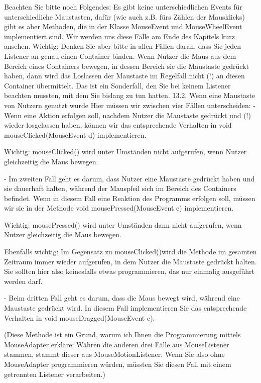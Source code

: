 Beachten Sie bitte noch Folgendes: Es gibt keine unterschiedlichen Events für unterschiedliche Maustasten, dafür (wie auch z.B. fürs Zählen der Mausklicks) gibt es aber Methoden, die in der Klasse MouseEvent und MouseWheelEvent implementiert sind. Wir werden uns diese Fälle am Ende des Kapitels kurz ansehen.
Wichtig: Denken Sie aber bitte in allen Fällen daran, dass Sie jeden Listener an genau einen Container binden. Wenn Nutzer die Maus aus dem Bereich eines Containers bewegen, in dessen Bereich sie die Maustaste gedrückt haben, dann wird das Loslassen der Maustaste im Regelfall nicht (!) an diesen Container übermittelt. Das ist ein Sonderfall, den Sie bei keinem Listener beachten mussten, mit dem Sie bislang zu tun hatten.
13.2.	Wenn eine Maustaste von Nutzern genutzt wurde
Hier müssen wir zwischen vier Fällen unterscheiden:
-	Wenn eine Aktion erfolgen soll, nachdem Nutzer die Maustaste gedrückt und (!) wieder losgelassen haben, können wir das entsprechende Verhalten in 
void mouseClicked(MouseEvent d) implementieren.

Wichtig: mouseClicked() wird unter Umständen nicht aufgerufen, wenn Nutzer gleichzeitig die Maus bewegen.

-	Im zweiten Fall geht es darum, dass Nutzer eine Maustaste gedrückt haben und sie dauerhaft halten, während der Mauspfeil sich im Bereich des Containers befindet. Wenn in diesem Fall eine Reaktion des Programms erfolgen soll, müssen wir sie in der Methode 
void mousePressed(MouseEvent e) implementieren. 

Wichtig: mousePressed() wird unter Umständen dann nicht aufgerufen, wenn Nutzer gleichzeitig die Maus bewegen.

Ebenfalls wichtig: Im Gegensatz zu mouseClicked()wird die Methode im gesamten Zeitraum immer wieder aufgerufen, in dem Nutzer die Maustaste gedrückt halten. Sie sollten hier also keinesfalls etwas programmieren, das nur einmalig ausgeführt werden darf.

-	Beim dritten Fall geht es darum, dass die Maus bewegt wird, während eine Maustaste gedrückt wird. In diesem Fall implementieren Sie das entsprechende Verhalten in 
void mouseDragged(MouseEvent e).

(Diese Methode ist ein Grund, warum ich Ihnen die Programmierung mittels MouseAdapter erkläre: Währen die anderen drei Fälle aus MouseListener stammen, stammt dieser aus MouseMotionListener. Wenn Sie also ohne MouseAdapter programmieren würden, müssten Sie diesen Fall mit einem getrennten Listener verarbeiten.)


